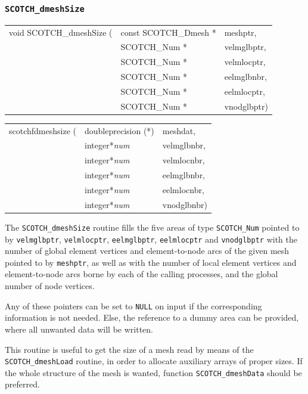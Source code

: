 \subsubsection{\texttt{SCOTCH\_dmeshSize}}

\begin{itemize}
\progsyn

{\tt\begin{tabular}{l@{}ll}
void SCOTCH\_dmeshSize ( & const SCOTCH\_Dmesh * & meshptr,    \\
                         & SCOTCH\_Num *         & velmglbptr, \\
                         & SCOTCH\_Num *         & velmlocptr, \\
                         & SCOTCH\_Num *         & eelmglbnbr, \\
                         & SCOTCH\_Num *         & eelmlocptr, \\
                         & SCOTCH\_Num *         & vnodglbptr)
\end{tabular}}

{\tt\begin{tabular}{l@{}ll}
scotchfdmeshsize ( & doubleprecision (*) & meshdat,    \\
                   & integer*{\it num}   & velmglbnbr, \\
                   & integer*{\it num}   & velmlocnbr, \\
                   & integer*{\it num}   & eelmglbnbr, \\
                   & integer*{\it num}   & eelmlocnbr, \\
                   & integer*{\it num}   & vnodglbnbr)
\end{tabular}}

\progdes

The \texttt{SCOTCH\_dmeshSize} routine fills the five areas of type
\texttt{SCOTCH\_\lbt Num} pointed to by \texttt{velmglbptr},
\texttt{velmlocptr}, \texttt{eelmglbptr}, \texttt{eelmlocptr} and
\texttt{vnodglbptr} with the number of global element vertices and
element-to-node arcs of the given mesh pointed to by {\tt meshptr}, as
well as with the number of local element vertices and element-to-node
arcs borne by each of the calling processes, and the global number of
node vertices.

Any of these pointers can be set to {\tt NULL} on input if the
corresponding information is not needed. Else, the reference to a
dummy area can be provided, where all unwanted data will be written.

This routine is useful to get the size of a mesh read by means
of the {\tt SCOTCH\_\lbt dmesh\lbo Load} routine, in order to allocate
auxiliary arrays of proper sizes. If the whole structure of the
mesh is wanted, function \texttt{SCOTCH\_dmesh\lbo Data} should be
preferred.

\end{itemize}

